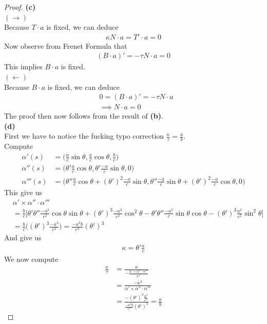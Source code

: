 \documentclass{report}
\begin{document}
\begin{proof}
\textbf{(c)}\\

$(\longrightarrow)$\\

Because $T \cdot a $ is fixed, we can deduce
\begin{align*}
\kappa N \cdot a =T'\cdot a=0
\end{align*}
Now observe from Frenet Formula that 
\begin{align*}
  (B \cdot a )'=- \tau N \cdot a =0 
\end{align*}
This implies $B \cdot a $ is fixed.\\

$(\longleftarrow)$\\

Because $B \cdot a$ is fixed, we can deduce
\begin{align*}
  &0= (B \cdot a)'=-\tau N \cdot a \\
 &\implies  N \cdot  a=0
\end{align*}
The proof then now follows from the result of  \textbf{(b)}.\\

\textbf{(d)}\\

First we have to notice the fucking typo correction $\frac{\kappa}{\tau}=\frac{a}{b}$.\\

Compute 
\begin{align*}
\alpha '(s)&=\Big(\frac{a}{c}\sin \theta, \frac{a}{c}\cos \theta, \frac{b}{c} \Big)\\
\alpha ''(s)&=\Big(\theta ' \frac{a}{c}\cos \theta , \theta ' \frac{-a}{c}\sin \theta, 0 \Big)\\
\alpha '''(s)&=\Big(\theta'' \frac{a}{c}\cos \theta + (\theta')^2 \frac{-a}{c}\sin \theta , \theta '' \frac{-a}{c}\sin \theta + (\theta ')^2 \frac{-a}{c}\cos \theta, 0 \Big)
\end{align*}
This give us 
\begin{align*}
&\alpha ' \times \alpha '' \cdot \alpha '''\\
&=\frac{b}{c}\Big[\theta ' \theta '' \frac{-a^2}{c^2}\cos \theta \sin \theta + (\theta ')^3 \frac{-a^2}{c^2}\cos ^2 \theta - \theta' \theta '' \frac{-a^2}{c}\sin \theta \cos \theta - (\theta ')^3 \frac{a^2}{c^2}\sin ^2 \theta \Big]\\
&=\frac{b}{c}\Big( (\theta ')^3 \frac{-a^2}{c^2} \Big)=\frac{-a^2b}{c^3}(\theta ')^3
\end{align*}
And give us 
\begin{align*}
\kappa = \theta' \frac{a}{c}
\end{align*}
We now compute 
\begin{align*}
\frac{\kappa}{\tau}&= \frac{\kappa}{-\frac{\alpha ' \times \alpha '' \cdot \alpha '''}{\kappa ^2}}\\
&=\frac{-\kappa ^3}{\alpha ' \times \alpha '' \cdot \alpha '''}\\
&=\frac{-(\theta')^3 \frac{a^3}{c^3}}{\frac{-a^2b}{c^3}(\theta ')^3}=\frac{a}{b}
\end{align*}



\end{proof}
\end{document}
